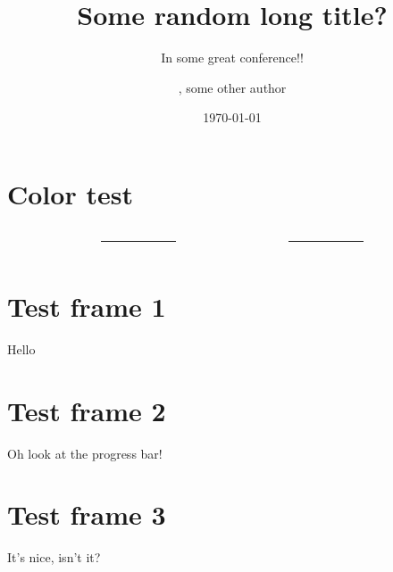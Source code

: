 \documentclass[%
    listings={
        Lean=listings-lean,
        Go
    },
]{custom}
\title[Short title]{Some random long title?}%
\subtitle{In some great conference!!}
\author[Short author name]{\speaker{Some random author}, some other author}
\institute{Some institute!}
\date{\today}
\begin{document}
\section{Color test}
\begin{sframe}
	\footnotesize
	\sffamily
	\begin{columns}
		\begin{column}{.27\linewidth}
			\begin{testcolors}[HTML]
			\end{testcolors}
		\end{column}
		\begin{column}{.05\linewidth}
			\centering
			\rule{.1mm}{.7\textheight}
		\end{column}
		\begin{column}{.27\linewidth}
			\begin{testcolors}[HTML]
			\end{testcolors}
		\end{column}
		\begin{column}{.05\linewidth}
			\centering
			\rule{.1mm}{.7\textheight}
		\end{column}
		\begin{column}{.27\linewidth}
			\begin{testcolors}[HTML]
			\end{testcolors}
		\end{column}
	\end{columns}
\end{sframe}

\section{Test frame 1}
\begin{sframe}
	Hello
\end{sframe}

\section{Test frame 2}
\begin{sframe}
	Oh look at the progress bar!
\end{sframe}

\section{Test frame 3}
\begin{sframe}
	It's nice, isn't it?
\end{sframe}
\end{document}
